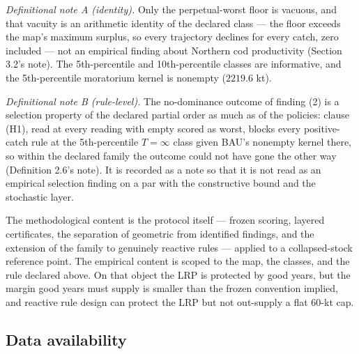\documentclass[11pt]{article}
\begin{document}
\emph{Definitional note A (identity).} Only the perpetual-worst floor is
vacuous, and that vacuity is an arithmetic identity of the declared
class --- the floor exceeds the map's maximum surplus, so every
trajectory declines for every catch, zero included --- not an empirical
finding about Northern cod productivity (Section 3.2's note). The
5th-percentile and 10th-percentile classes are informative, and the
5th-percentile moratorium kernel is nonempty (\(2219.6\) kt).

\emph{Definitional note B (rule-level).} The no-dominance outcome of
finding (2) is a selection property of the declared partial order as
much as of the policies: clause (H1), read at every reading with empty
scored as worst, blocks every positive-catch rule at the 5th-percentile
\(T=\infty\) class given BAU's nonempty kernel there, so within the
declared family the outcome could not have gone the other way
(Definition 2.6's note). It is recorded as a note so that it is not read
as an empirical selection finding on a par with the constructive bound
and the stochastic layer.

The methodological content is the protocol itself --- frozen scoring,
layered certificates, the separation of geometric from identified
findings, and the extension of the family to genuinely reactive rules
--- applied to a collapsed-stock reference point. The empirical content
is scoped to the map, the classes, and the rule declared above. On that
object the LRP is protected by good years, but the margin good years
must supply is smaller than the frozen convention implied, and reactive
rule design can protect the LRP but not out-supply a flat 60-kt cap.

\subsection{Data availability}\label{data-availability}
\end{document}
